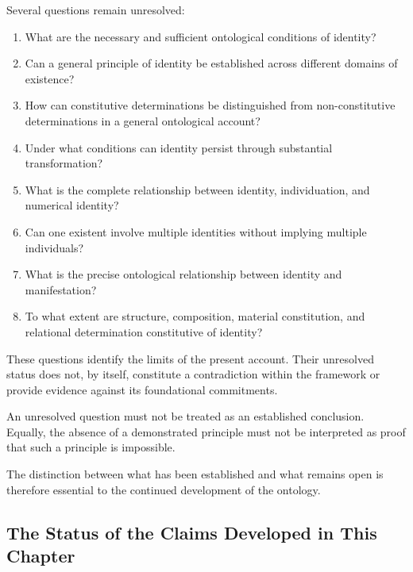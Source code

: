 Several questions remain unresolved:

\begin{enumerate}
    \item What are the necessary and sufficient ontological
    conditions of identity?

    \item Can a general principle of identity be established
    across different domains of existence?

    \item How can constitutive determinations be distinguished
    from non-constitutive determinations in a general
    ontological account?

    \item Under what conditions can identity persist
    through substantial transformation?

    \item What is the complete relationship between
    identity, individuation, and numerical identity?

    \item Can one existent involve multiple identities
    without implying multiple individuals?

    \item What is the precise ontological relationship
    between identity and manifestation?

    \item To what extent are structure, composition,
    material constitution, and relational determination
    constitutive of identity?
\end{enumerate}

These questions identify the limits of the present account.
Their unresolved status does not, by itself, constitute
a contradiction within the framework or provide evidence
against its foundational commitments.

An unresolved question must not be treated as an
established conclusion. Equally, the absence of a
demonstrated principle must not be interpreted as proof
that such a principle is impossible.

The distinction between what has been established and
what remains open is therefore essential to the continued
development of the ontology.

\subsection{The Status of the Claims Developed in This Chapter}

